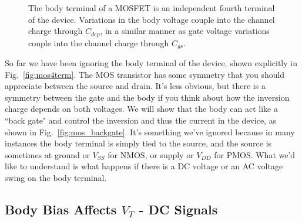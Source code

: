 \begin{figure}[b]
\begin{center}
\end{center}
\caption{The body terminal of a MOSFET is an independent fourth terminal of the device.  Variations in the body voltage couple into the channel charge through $C_{dep}$, in a similar manner as gate voltage variations couple into the channel charge through $C_{gs}$. } 
\end{figure}

So far we have been ignoring the body terminal of the device, shown explicitly in Fig.~\ref{fig:mos4term}.  The MOS transistor has some symmetry that you should appreciate between the source and drain.  It's less obvious, but there is a symmetry between the gate and the body if you think about how the inversion charge depends on both voltages. We will show that the body can act like a ``back gate" and control the inversion and thus the current in the device, as shown in Fig.~\ref{fig:mos_backgate}.  It's something we've ignored because in many instances the body terminal is simply tied to the source, and the source is sometimes at ground or $V_{SS}$ for NMOS, or supply or $V_{DD}$ for PMOS.  What we'd like to understand is what happens if there is a DC voltage or an AC voltage swing on the body terminal.
 

\subsection{Body Bias Affects $V_T$ - DC Signals}

